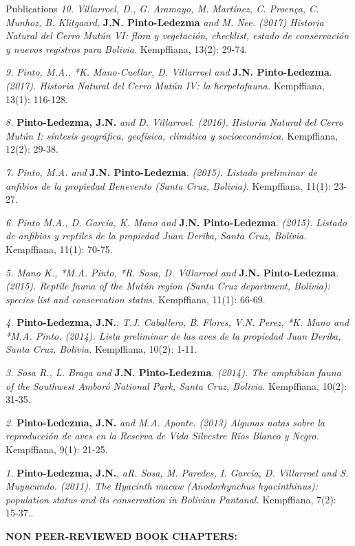 \documentclass{resume} %
\begin{document}
\begin{rSection}{Publications}
{\em 10.} {\em Villarroel, D., G. Aramayo, M. Martínez, C. Proença, C. Munhoz, B. Klitgaard,} {\bf{J.N. Pinto-Ledezma}} {\em and M. Nee. (2017) Historia Natural del Cerro Mutún VI: flora y vegetación, checklist, estado de conservación y nuevos registros para Bolivia.} {Kempffiana, 13(2): 29-74}.

{\em 9.} {\em *Pinto, M.A., *K. Mano-Cuellar, D. Villarroel and} {\bf{J.N. Pinto-Ledezma}}. {\em (2017). Historia Natural del Cerro Mutún IV: la herpetofauna.} {Kempffiana, 13(1): 116-128}.

{\em 8.} {\bf{Pinto-Ledezma, J.N.}} {\em and D. Villarroel. (2016). Historia Natural del Cerro Mutún I: síntesis geográfica, geofísica, climática y socioeconómica.} {Kempffiana, 12(2): 29-38}.

{\em 7.} {\em *Pinto, M.A. and} {\bf{J.N. Pinto-Ledezma}}. {\em (2015). Listado preliminar de anfibios de la propiedad Benevento (Santa Cruz, Bolivia).} {Kempffiana, 11(1): 23-27}.

{\em 6.} {\em *Pinto M.A., D. García, K. Mano and} {\bf{J.N. Pinto-Ledezma}}. {\em (2015). Listado de anfibios y reptiles de la propiedad Juan Deriba, Santa Cruz, Bolivia.} {Kempffiana, 11(1): 70-75}.

{\em 5.} {\em *Mano K., *M.A. Pinto, *R. Sosa, D. Villarroel and} {\bf{J.N. Pinto-Ledezma}}. {\em (2015). Reptile fauna of the Mutún region (Santa Cruz department, Bolivia): species list and conservation status.} {Kempffiana, 11(1): 66-69}.

{\em 4.} {\bf{Pinto-Ledezma, J.N.}}, {\em T.J. Caballero, B. Flores, V.N. Perez, *K. Mano and *M.A. Pinto. (2014). Lista preliminar de las aves de la propiedad Juan Deriba, Santa Cruz, Bolivia.} {Kempffiana, 10(2): 1-11}.

{\em 3.} {\em *Sosa R., L. Braga and} {\bf{J.N. Pinto-Ledezma}}. {\em (2014). The amphibian fauna of the Southwest Amboró National Park, Santa Cruz, Bolivia.} {Kempffiana, 10(2): 31-35}.

{\em 2.} {\bf{Pinto-Ledezma, J.N.}} {\em and M.A. Aponte. (2013) Algunas notas sobre la reproducción de aves en la Reserva de Vida Silvestre Ríos Blanco y Negro.} {Kempffiana, 9(1): 21-25}.

{\em 1.} {\bf{Pinto-Ledezma, J.N.}}, {\em aR. Sosa, M. Paredes, I. García, D. Villarroel and S. Muyucundo. (2011). The Hyacinth macaw ({\em Anodorhynchus hyacinthinus}): population status and its conservation in Bolivian Pantanal.} {Kempffiana, 7(2): 15-37.}. 

{\bf NON PEER-REVIEWED BOOK CHAPTERS:}


\end{rSection}
\end{document}
